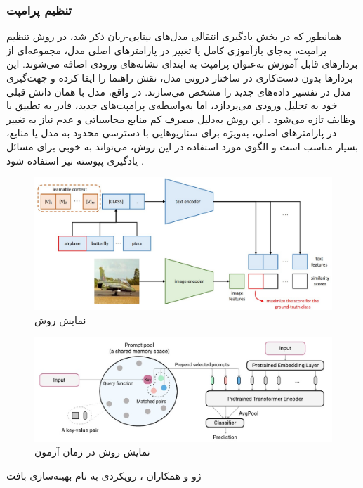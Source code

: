 \subsubsection{تنظیم پرامپت}
همانطور که در بخش یادگیری انتقالی مدل‌های بینایی-زبان ذکر شد، در روش تنظیم پرامپت، به‌جای بازآموزی کامل یا تغییر در پارامتر‌های اصلی مدل، مجموعه‌ای از بردارهای قابل‌ آموزش به‌عنوان پرامپت به ابتدای نشانه‌های ورودی
اضافه می‌شوند. این بردارها بدون دست‌کاری در ساختار درونی مدل، نقش راهنما را ایفا کرده و جهت‌گیری مدل در تفسیر داده‌های جدید را مشخص می‌سازند. در واقع، مدل با همان دانش قبلی خود به تحلیل ورودی می‌پردازد، اما به‌واسطه‌ی پرامپت‌های جدید، قادر به تطبیق با وظایف تازه می‌شود \cite{llm_continual}. این روش به‌دلیل مصرف کم منابع محاسباتی و عدم نیاز به تغییر در پارامتر‌های اصلی، به‌ویژه برای سناریوهایی با دسترسی محدود به مدل یا منابع، بسیار مناسب است و الگوی مورد استفاده در این روش، می‌تواند به خوبی برای مسائل یادگیری پیوسته نیز استفاده شود
\cite{llm_continual}.
\begin{figure}
	\centering\includegraphics[scale=.55]{Images/Chapter2/CoOp.jpg}
	\caption[]{ نمایش روش 
		\protect\cite{CoOp}}
	\label{fig.23}
\end{figure}
\begin{figure}
	\centering\includegraphics[scale=.65]{Images/Chapter2/l2p.jpg}
	\caption[]{ نمایش روش 
		در زمان آزمون
		\protect\cite{l2p}}
	\label{fig.24}
\end{figure}
ژو و همکاران 
\cite{CoOp}،
رویکردی به نام بهینه‌سازی بافت 
